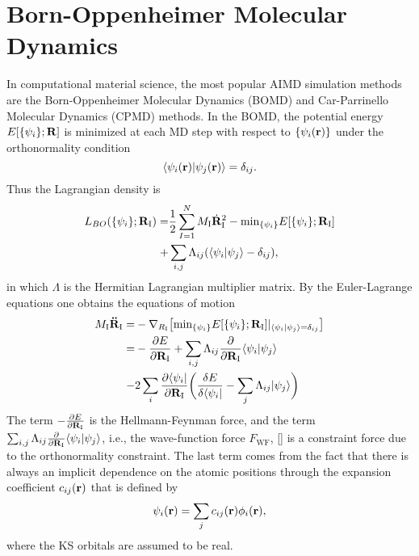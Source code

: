 \section{Born-Oppenheimer Molecular Dynamics}
In computational material science, the most popular AIMD simulation methods are the Born-Oppenheimer Molecular Dynamics (BOMD) and Car-Parrinello Molecular Dynamics (CPMD) methods. 
In the BOMD, the potential energy $E[\{\psi_i\};\bf{R}]$ is minimized at each MD step with respect to $\{\psi_i({\bf r})\}$  under the orthonormality condition
\begin{equation}
\langle\psi_i({\bf{r}})|\psi_j({\bf r})\rangle=\delta_{ij}.
\label{eq:e_XC}
\end{equation}
Thus the Lagrangian density is 
\begin{align}
L_{BO} (\{\psi_i\}; {\bf R}_{\text{I}})=&\frac{1}{2}\sum^N_{I=1}M_{\text{I}}\dot{\bf R}^2_{\text{I}} - {\text{min}}_{\{\psi_i\}}E[\{\psi_i\};{\bf R}_{\text{I}}] \nonumber \\
             +& \sum_{i,j}\Lambda_{ij}(\langle\psi_i|\psi_j\rangle-\delta_{ij} ),
\label{eq:L_BO}
\end{align}
in which $\Lambda$ is the Hermitian Lagrangian multiplier matrix. By the Euler-Lagrange equations one obtains the equations of motion
\begin{align}
     M_{\text{I}}{\bf \ddot{R}}_{\text{I}} =& -\nabla_{R_{\text{I}}} \bigl[ {\text{min}}_{\{\psi_i\}}E[\{\psi_i\};{\bf R}_{\text{I}}] |_{\langle\psi_i|\psi_j\rangle=\delta_{ij} }\bigr]\nonumber \\
     =&-\frac{\partial E}{\partial {\bf R}_{\text{I}}}  + \sum_{i,j}\Lambda_{ij}\frac{\partial}{\partial {\bf R}_{\text{I}}}\langle\psi_i|\psi_j\rangle \nonumber \\
     -&2\sum_i \frac{\partial \langle\psi_i|}{\partial {\bf R}_{\text{I}}}\biggl(\frac{\delta E}{\delta\langle\psi_i|}-\sum_j \Lambda_{ij}|\psi_j\rangle\biggr) 
\label{eq:LEE_BO}
\end{align}
The term $-\frac{\partial E}{\partial {\bf R}_{\text{I}}}$ is the Hellmann-Feynman force, and the term $\sum_{i,j}\Lambda_{ij}\frac{\partial}{\partial {\bf R}_{\text{I}}}\langle\psi_i|\psi_j\rangle$, i.e., the wave-function force $F_{\text{WF}}$, [\cite{Pulay69}] is a constraint force due to the orthonormality constraint. The last term comes from the fact that there is always an implicit dependence on the atomic positions through the expansion coefficient $c_{ij}({\bf r})$ that is defined by 
\begin{equation}
\psi_i({\bf r})=\sum_j c_{ij}({\bf r})\phi_i({\bf r}),
\label{eq:linear_combination}
\end{equation}
where the KS orbitals are assumed to be real.

